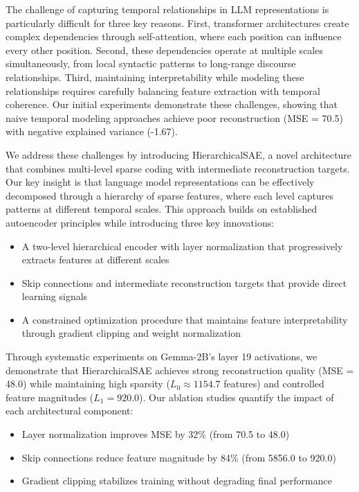 \documentclass{article} %
\begin{document}
The challenge of capturing temporal relationships in LLM representations is particularly difficult for three key reasons. First, transformer architectures \cite{vaswani2017attention} create complex dependencies through self-attention, where each position can influence every other position. Second, these dependencies operate at multiple scales simultaneously, from local syntactic patterns to long-range discourse relationships. Third, maintaining interpretability while modeling these relationships requires carefully balancing feature extraction with temporal coherence. Our initial experiments demonstrate these challenges, showing that naive temporal modeling approaches achieve poor reconstruction (MSE = 70.5) with negative explained variance (-1.67).

We address these challenges by introducing HierarchicalSAE, a novel architecture that combines multi-level sparse coding with intermediate reconstruction targets. Our key insight is that language model representations can be effectively decomposed through a hierarchy of sparse features, where each level captures patterns at different temporal scales. This approach builds on established autoencoder principles while introducing three key innovations:

\begin{itemize}
    \item A two-level hierarchical encoder with layer normalization that progressively extracts features at different scales
    \item Skip connections and intermediate reconstruction targets that provide direct learning signals
    \item A constrained optimization procedure that maintains feature interpretability through gradient clipping and weight normalization
\end{itemize}

Through systematic experiments on Gemma-2B's layer 19 activations, we demonstrate that HierarchicalSAE achieves strong reconstruction quality (MSE = 48.0) while maintaining high sparsity ($L_0 \approx 1154.7$ features) and controlled feature magnitudes ($L_1 = 920.0$). Our ablation studies quantify the impact of each architectural component:
\begin{itemize}
    \item Layer normalization improves MSE by 32\% (from 70.5 to 48.0)
    \item Skip connections reduce feature magnitude by 84\% (from 5856.0 to 920.0)
    \item Gradient clipping stabilizes training without degrading final performance
\end{itemize}
\end{document}
